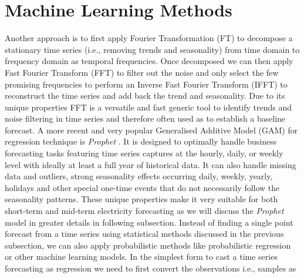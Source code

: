 \documentclass[mstat,12pt]{unswthesis}
\begin{document}
\section{Machine Learning Methods}\label{machine-learning-methods}

Another approach is to first apply Fourier Transformation (FT) to
decompose a stationary time series (i.e., removing trends and
seasonality) from time domain to frequency domain as temporal
frequencies. Once decomposed we can then apply Fast Fourier Transform
(FFT) \cite{shannon1948mathematical} to filter out the noise and only
select the few promising frequencies to perform an Inverse Fast Fourier
Transform (IFFT) to reconstruct the time series and add back the trend
and seasonality. Due to its unique properties FFT is a versatile and
fast generic tool to identify trends and noise filtering in time series
and therefore often used as to establish a baseline forecast. A more
recent and very popular Generalised Additive Model (GAM) for regression
technique is \emph{Prophet} \cite{taylor2017facebook}. It is designed to
optimally handle business forecasting tasks featuring time series
captures at the hourly, daily, or weekly level with ideally at least a
full year of historical data. It can also handle missing data and
outliers, strong seasonality effects occurring daily, weekly, yearly,
holidays and other special one-time events that do not necessarily
follow the seasonality patterns. These unique properties make it very
suitable for both short-term and mid-term electricity forecasting as we
will discuss the \emph{Prophet} model in greater details in following
subsection. Instead of finding a single point forecast from a time
series using statistical methods discussed in the previous subsection,
we can also apply probabilistic methods like probabilistic regression or
other machine learning models. In the simplest form to cast a time
series forecasting as regression we need to first convert the
observations i.e., samples as 
\end{document}
